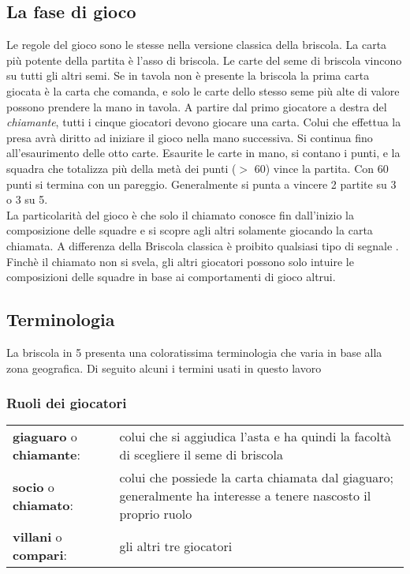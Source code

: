 \subsection{La fase di gioco}

Le regole del gioco sono le stesse nella versione classica della briscola.
La carta più potente della partita è l'asso di briscola.
Le carte del seme di briscola vincono su tutti gli altri semi.
Se in tavola non è presente la briscola la prima carta giocata è la carta che comanda, e solo le carte dello stesso seme più alte di valore possono prendere la mano in tavola.
A partire dal primo giocatore a destra del \emph{chiamante}, tutti i cinque giocatori devono giocare una carta.
Colui che effettua la presa avrà diritto ad iniziare il gioco nella mano successiva.
Si continua fino all'esaurimento delle otto carte. Esaurite le carte in mano, si contano i punti, e la squadra che totalizza più della metà dei punti ($ > $ 60) vince la partita.
Con 60 punti si termina con un pareggio.
Generalmente si punta a vincere 2 partite su 3 o 3 su 5.\\
La particolarità del gioco è che solo il chiamato conosce fin dall'inizio la composizione delle squadre e si scopre agli altri solamente giocando la carta chiamata. A differenza della Briscola classica è proibito qualsiasi tipo di segnale \cite{enciclopediacarte}.\\
Finchè il chiamato non si svela, gli altri giocatori possono solo intuire le composizioni delle squadre in base ai comportamenti di gioco altrui.

\subsection{Terminologia}

La briscola in 5 presenta una coloratissima terminologia che varia in base alla zona geografica.
Di seguito alcuni i termini usati in questo lavoro

\subsubsection*{Ruoli dei giocatori}
\vspace{4mm}
\begin{tabular}{l p{}}
\textbf{giaguaro} o \textbf{chiamante}: & colui che si aggiudica l'asta e ha quindi la facoltà di scegliere il seme di briscola \\
\textbf{socio} o \textbf{chiamato}: & colui che possiede la carta chiamata dal giaguaro; generalmente ha interesse a tenere nascosto il proprio ruolo \\
\textbf{villani} o \textbf{compari}: & gli altri tre giocatori \\   
\end{tabular}\\


